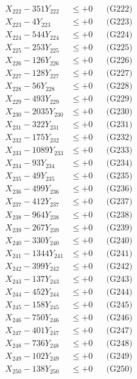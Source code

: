 \documentclass[a4paper,10pt]{article}
\begin{document}
{\begin{align}
X_{222} - 351Y_{222} &\leq +0 && \text{(G222)} \\
X_{223} - 4Y_{223} &\leq +0 && \text{(G223)} \\
X_{224} - 544Y_{224} &\leq +0 && \text{(G224)} \\
X_{225} - 253Y_{225} &\leq +0 && \text{(G225)} \\
X_{226} - 126Y_{226} &\leq +0 && \text{(G226)} \\
X_{227} - 128Y_{227} &\leq +0 && \text{(G227)} \\
X_{228} - 56Y_{228} &\leq +0 && \text{(G228)} \\
X_{229} - 493Y_{229} &\leq +0 && \text{(G229)} \\
X_{230} - 2035Y_{230} &\leq +0 && \text{(G230)} \\
\allowbreak
X_{231} - 322Y_{231} &\leq +0 && \text{(G231)} \\
X_{232} - 175Y_{232} &\leq +0 && \text{(G232)} \\
X_{233} - 1089Y_{233} &\leq +0 && \text{(G233)} \\
X_{234} - 93Y_{234} &\leq +0 && \text{(G234)} \\
X_{235} - 49Y_{235} &\leq +0 && \text{(G235)} \\
X_{236} - 499Y_{236} &\leq +0 && \text{(G236)} \\
X_{237} - 412Y_{237} &\leq +0 && \text{(G237)} \\
X_{238} - 964Y_{238} &\leq +0 && \text{(G238)} \\
X_{239} - 267Y_{239} &\leq +0 && \text{(G239)} \\
X_{240} - 330Y_{240} &\leq +0 && \text{(G240)} \\
\allowbreak
X_{241} - 1344Y_{241} &\leq +0 && \text{(G241)} \\
X_{242} - 399Y_{242} &\leq +0 && \text{(G242)} \\
X_{243} - 137Y_{243} &\leq +0 && \text{(G243)} \\
X_{244} - 452Y_{244} &\leq +0 && \text{(G244)} \\
X_{245} - 158Y_{245} &\leq +0 && \text{(G245)} \\
X_{246} - 750Y_{246} &\leq +0 && \text{(G246)} \\
X_{247} - 401Y_{247} &\leq +0 && \text{(G247)} \\
X_{248} - 736Y_{248} &\leq +0 && \text{(G248)} \\
X_{249} - 102Y_{249} &\leq +0 && \text{(G249)} \\
X_{250} - 138Y_{250} &\leq +0 && \text{(G250)} \\

\end{align}}
\end{document}
